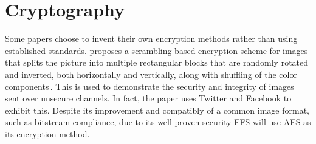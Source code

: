 \section{Cryptography}
Some papers choose to invent their own encryption methods rather than using established standards. \citeauthor{chumanEncryptionThenCompressionSystemsUsing2019} proposes a scrambling-based encryption scheme for images that splits the picture into multiple rectangular blocks that are randomly rotated and inverted, both horizontally and vertically, along with shuffling of the color components\,\cite{chumanEncryptionThenCompressionSystemsUsing2019}. This is used to demonstrate the security and integrity of images sent over unsecure channels. In fact, the paper uses Twitter and Facebook to exhibit this. Despite its improvement and compatibly of a common image format, such as bitstream compliance, due to its well-proven security FFS will use AES as its encryption method. 